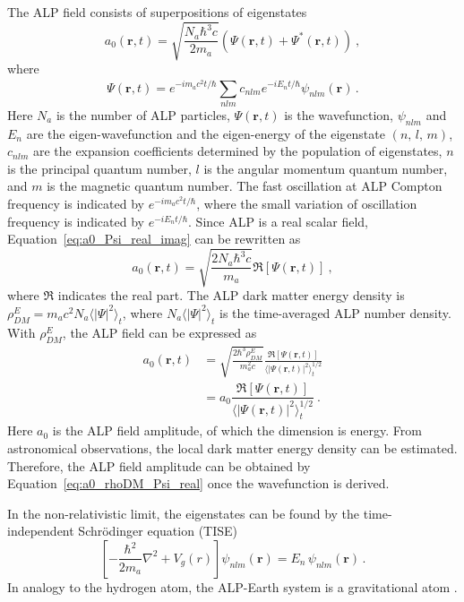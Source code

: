 The ALP field consists of superpositions of eigenstates
\begin{equation}
    a_0(\mathbf{r}, t) = \sqrt{\frac{N_a \hbar^3 c}{2 m_a}} \left(\Psi(\mathbf{r}, t) + \Psi^*(\mathbf{r}, t) \right)~, 
    \label{eq:a0_Psi_real_imag}
\end{equation}
where
\begin{equation}
    \Psi(\mathbf{r}, t) = e^{-i m_a c^2 t / \hbar}\sum_{nlm}^{} c_{nlm} e^{-i E_n t / \hbar} \psi_{nlm}(\mathbf{r})\,.
    \label{eq:Psi_r_t}
\end{equation}
Here $N_a$ is the number of ALP particles, $\Psi(\mathbf{r}, t)$ is the wavefunction, $\psi_{nlm}$ and $E_n$ are the eigen-wavefunction and the eigen-energy of the eigenstate $(n,\,l,\,m)$, $c_{nlm}$ are the expansion coefficients determined by the population of eigenstates, $n$ is the principal quantum number, $l$ is the angular momentum quantum number, and $m$ is the magnetic quantum number.
The fast oscillation at ALP Compton frequency is indicated by $e^{-i m_a c^2 t / \hbar}$, where the small variation of oscillation frequency is indicated by $e^{-i E_n t / \hbar}$.
Since ALP is a real scalar field, Equation~\ref{eq:a0_Psi_real_imag} can be rewritten as
\begin{equation}
    a_0(\mathbf{r}, t) = \sqrt{\frac{2 N_a \hbar^3 c }{m_a}} \Re\left[\Psi(\mathbf{r}, t)\right]~,
    \label{eq:a0_Psi_real}
\end{equation}
where $\Re$ indicates the real part. 
The ALP dark matter energy density is $\rho_{DM}^{E} = m_a c^2 N_a \langle|\Psi|^2\rangle_t$, where $N_a \langle|\Psi|^2\rangle_t$ is the time-averaged ALP number density. With $\rho_{DM}^{E}$, the ALP field can be expressed as
\begin{align}
    a_0(\mathbf{r}, t) &= \sqrt{\frac{2 \hbar^3 \rho_{DM}^{E}}{m_a^2 c}} \frac{\Re\left[\Psi(\mathbf{r}, t)\right]}{\langle|\Psi(\mathbf{r}, t)|^2\rangle_t^{1/2}}\\ 
    &= a_0 \dfrac{\Re\left[\Psi(\mathbf{r}, t)\right]}{\langle|\Psi(\mathbf{r}, t)|^2\rangle_t^{1/2}}~.
    \label{eq:a0_rhoDM_Psi_real}
\end{align}
Here $a_0$ is the ALP field amplitude, of which the dimension is energy. 
From astronomical observations, the local dark matter energy density can be estimated. 
Therefore, the ALP field amplitude can be obtained by Equation~\ref{eq:a0_rhoDM_Psi_real} once the wavefunction is derived.

In the non-relativistic limit, the eigenstates can be found by the time-independent Schrödinger equation (TISE)
\begin{equation}
    \left[-\frac{\hbar^2}{2 m_a}\nabla^2 + V_g(r)\right]\psi_{nlm}(\mathbf{r})
    = E_n\,\psi_{nlm}(\mathbf{r})
    \,.\label{eq:schrodinger_earth}
\end{equation} 
In analogy to the hydrogen atom, the ALP-Earth system is a gravitational atom . 

